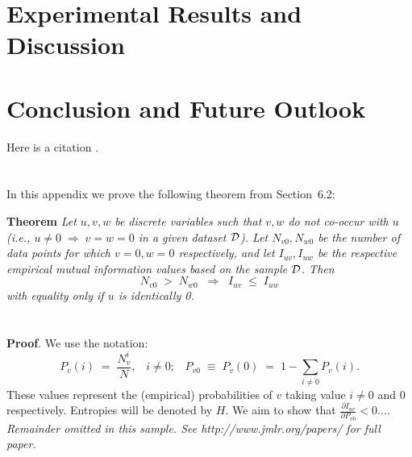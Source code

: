 \documentclass[twoside,11pt]{article}
\newcommand{\dataset}{{\cal D}}
\newcommand{\fracpartial}[2]{\frac{\partial #1}{\partial  #2}}
\begin{document}
\section{Experimental Results and Discussion}


\section{Conclusion and Future Outlook}

Here is a citation \cite{EAGGA}.


\newpage

\appendix
\section{}
\label{app:theorem}



In this appendix we prove the following theorem from
Section~6.2:

\noindent
{\bf Theorem} {\it Let $u,v,w$ be discrete variables such that $v, w$ do
not co-occur with $u$ (i.e., $u\neq0\;\Rightarrow \;v=w=0$ in a given
dataset $\dataset$). Let $N_{v0},N_{w0}$ be the number of data points for
which $v=0, w=0$ respectively, and let $I_{uv},I_{uw}$ be the
respective empirical mutual information values based on the sample
$\dataset$. Then
\[
	N_{v0} \;>\; N_{w0}\;\;\Rightarrow\;\;I_{uv} \;\leq\;I_{uw}
\]
with equality only if $u$ is identically 0.} \hfill\BlackBox

\section{}

\noindent
{\bf Proof}. We use the notation:
\[
P_v(i) \;=\;\frac{N_v^i}{N},\;\;\;i \neq 0;\;\;\;
P_{v0}\;\equiv\;P_v(0)\; = \;1 - \sum_{i\neq 0}P_v(i).
\]
These values represent the (empirical) probabilities of $v$
taking value $i\neq 0$ and 0 respectively.  Entropies will be denoted
by $H$. We aim to show that $\fracpartial{I_{uv}}{P_{v0}} < 0$....\\

{\noindent \em Remainder omitted in this sample. See http://www.jmlr.org/papers/ for full paper.}


\vskip 0.2in

\end{document}
